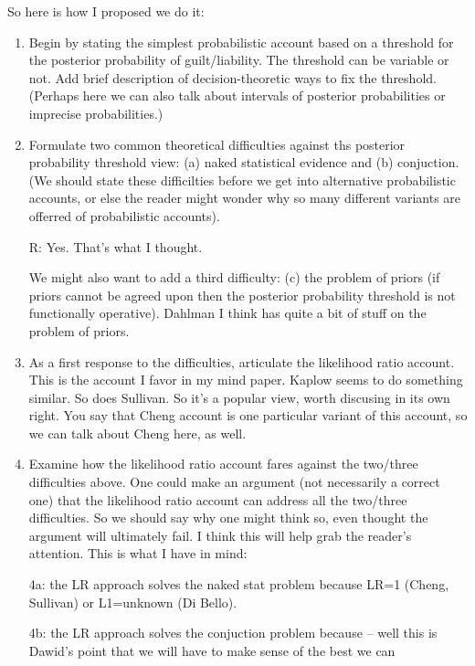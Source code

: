 \documentclass[10pt,dvipsnames,enabledeprecatedfontcommands]{scrartcl}
\begin{document}
So here is how I proposed we do it:

\begin{enumerate}

\item Begin by stating the simplest probabilistic account based on a threshold for the 
posterior probability of guilt/liability. The threshold can be variable or not. Add brief description of decision-theoretic ways to fix the threshold. (Perhaps here we can also 
talk about intervals of posterior probabilities or imprecise probabilities.) 


\item Formulate two common theoretical difficulties against ths posterior 
probability threshold view: (a) naked statistical evidence and (b) conjuction.
(We should state these difficilties before we get 
into alternative probabilistic accounts, or else the reader might 
wonder why so many different variants are offerred of probabilistic accounts). 

R: Yes. That's what I thought.


We might also want to add a third difficulty: (c) the problem of priors (if priors cannot be agreed 
upon then the posterior probability threshold is not functionally operative). Dahlman I think has quite a bit of stuff on the problem of priors. 

\item  As a first response to the difficulties, articulate the likelihood ratio account. 
This is the account I favor in my mind paper. Kaplow seems to do something similar. So does Sullivan. So it's a  popular view, worth discusing in its own right. You say that Cheng account is one particular variant of this account, so we can talk about Cheng here, as well.

\item Examine how the likelihood ratio account fares against the two/three difficulties above. One could make an argument (not necessarily a correct one) that the likelihood ratio account can address all the two/three difficulties. So we should say why one might think so, even thought the argument will ultimately fail. I think this will help grab the reader's attention. This is what I have in mind:

4a: the LR approach solves the naked stat problem because LR=1 (Cheng, Sullivan) or L1=unknown (Di Bello). 

4b: the LR approach solves the conjuction problem because -- well this is Dawid's point that we will have to make sense of the best we can


\end{enumerate}
\end{document}
